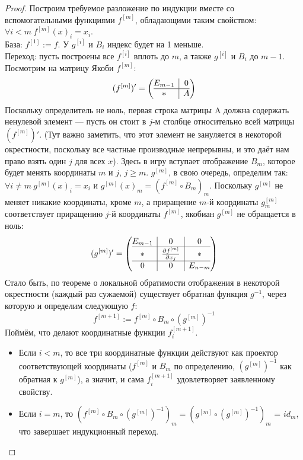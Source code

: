 \begin{proof}
	Построим требуемое разложение по индукции вместе со вспомогательными функциями $f^{[m]}$, обладающими таким свойством: $\forall i < m \ f^{[m]}(x)_i = x_i$. \\
	База: $f^{[1]} := f$. У $g^{[i]}$ и $B_i$ индекс будет на 1 меньше. \\
	Переход: пусть построены все $f^{[i]}$ вплоть до $m$, а также $g^{[i]}$ и $B_i$ до $m - 1$.
	Посмотрим на матрицу Якоби $f^{[m]}$:
	\[
		(f^{[m]})' =
		\left(\begin{array}{@{}c|c@{}}
		E_{m-1} & 0\\
		\hline
		* & A\end{array}\right)
	\]
	Поскольку определитель не ноль, первая строка матрицы A должна содержать ненулевой элемент --- пусть он стоит в $j$-м столбце относительно всей матрицы $(f^{[m]})'$. (Тут важно заметить, что этот элемент не зануляется в некоторой окрестности, поскольку все частные производные непрерывны, и это даёт нам право взять один $j$ для всех $x$).	Здесь в игру вступает отображение $B_m$, которое будет менять координаты $m$ и $j$, $j \geq m$. $g^{[m]}$, в свою очередь, определим так: $\forall i \neq m \ g^{[m]}(x)_i = x_i$ и $g^{[m]}(x)_m = (f^{[m]} \circ B_m)_m$. Поскольку $g^{[m]}$ не меняет никакие координаты, кроме $m$, а приращение $m$-й координаты $g^{[m]}_m$ соответствует приращению $j$-й координаты $f^{[m]}$, якобиан $g^{[m]}$ не обращается в ноль:
	\[
		(g^{[m]})' =
		\left(\begin{array}{@{}c|c|c@{}}
			E_{m-1} & 0 & 0\\
			\hline
			* & \pd{f^{[m]}}{x_j} & *\\
			\hline
			0 & 0 & E_{n-m}
		\end{array}\right)
	\]
	Стало быть, по теореме о локальной обратимости отображения в некоторой окрестности (каждый раз сужаемой) существует обратная функция $g^{-1}$, через которую и определим следующую $f$:
	\[
		f^{[m+1]} := f^{[m]} \circ B_m \circ (g^{[m]})^{-1}
	\]
	Поймём, что делают координатные функции $f_i^{[m+1]}$.
	\begin{itemize}
		\item 
		Если $i < m$, то все три координатные функции действуют как проектор соответствующей координаты ($f^{[m]}$ и $B_m$ по определению, $(g^{[m]})^{-1}$ как обратная к $g^{[m]}$), а значит, и сама $f_i^{[m+1]}$ удовлетворяет заявленному свойству.
		\item 
		Если $i = m$, то $(f^{[m]} \circ B_m \circ (g^{[m]})^{-1})_m = (g^{[m]} \circ (g^{[m]})^{-1})_m$ = $id_m$, что завершает индукционный переход.

\end{itemize}
\end{proof}
